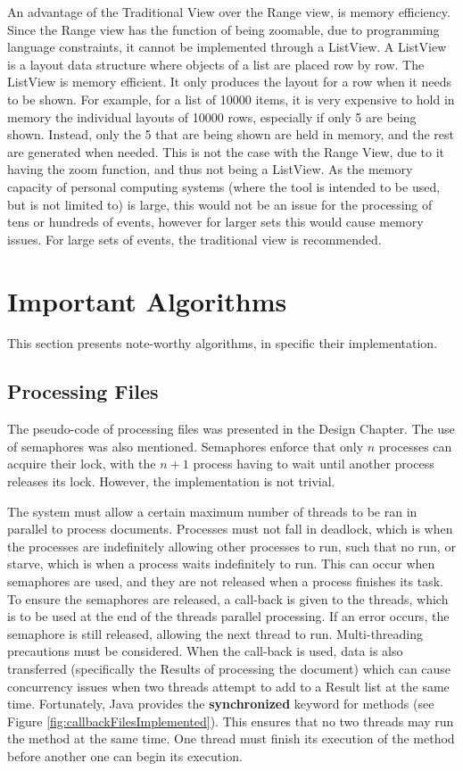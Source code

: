 \par An advantage of the Traditional View over the Range view, is memory efficiency. Since the Range view has the function of being zoomable, due to programming language constraints, it cannot be implemented through a ListView. A ListView is a layout data structure where objects of a list are placed row by row. The ListView is memory efficient. It only produces the layout for a row when it needs to be shown. For example, for a list of 10000 items, it is very expensive to hold in memory the individual layouts of 10000 rows, especially if only 5 are being shown. Instead, only the 5 that are being shown are held in memory, and the rest are generated when needed. This is not the case with the Range View, due to it having the zoom function, and thus not being a ListView. As the memory capacity of personal computing systems (where the tool is intended to be used, but is not limited to) is large, this would not be an issue for the processing of tens or hundreds of events, however for larger sets this would cause memory issues. For large sets of events, the traditional view is recommended.

\section{Important Algorithms}
\par This section presents note-worthy algorithms, in specific their implementation.
\subsection{Processing Files}
\par The pseudo-code of processing files was presented in the Design Chapter. The use of semaphores was also mentioned. Semaphores enforce that only $n$ processes can acquire their lock, with the $n+1$ process having to wait until another process releases its lock. However, the implementation is not trivial.

\par The system must allow a certain maximum number of threads to be ran in parallel to process documents. Processes must not fall in deadlock, which is when the processes are indefinitely allowing other processes to run, such that no run, or starve, which is when a process waits indefinitely to run. This can occur when semaphores are used, and they are not released when a process finishes its task. To ensure the semaphores are released, a call-back is given to the threads, which is to be used at the end of the threads parallel processing. If an error occurs, the semaphore is still released, allowing the next thread to run. Multi-threading precautions must be considered. When the call-back is used, data is also transferred (specifically the Results of processing the document) which can cause concurrency issues when two threads attempt to add to a Result list at the same time. Fortunately, Java provides the \textbf{synchronized} keyword for methods (see Figure \ref{fig:callbackFilesImplemented}). This ensures that no two threads may run the method at the same time. One thread must finish its execution of the method before another one can begin its execution.

